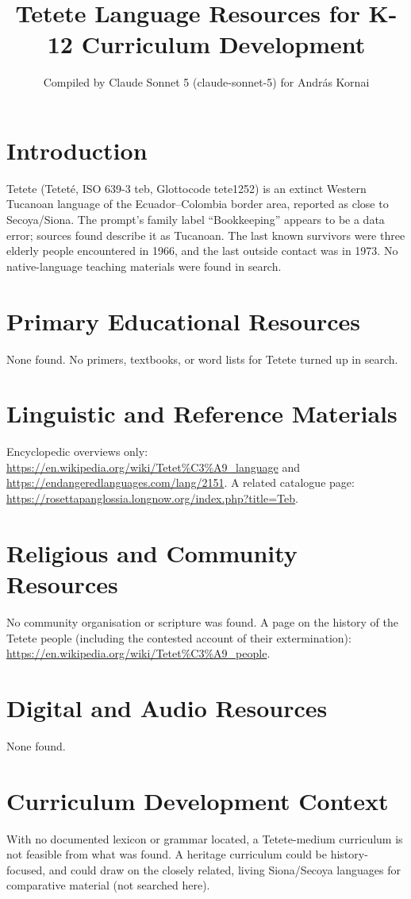 \documentclass[12pt]{article}
\title{Tetete Language Resources for K-12 Curriculum Development}
\author{Compiled by Claude Sonnet 5 (claude-sonnet-5) for Andr\'as Kornai}
\date{}
\begin{document}
\maketitle
\section{Introduction}
Tetete (Tetet\'e, ISO 639-3 teb, Glottocode tete1252) is an extinct Western Tucanoan language of the Ecuador--Colombia border area, reported as close to Secoya/Siona. The prompt's family label ``Bookkeeping'' appears to be a data error; sources found describe it as Tucanoan. The last known survivors were three elderly people encountered in 1966, and the last outside contact was in 1973. No native-language teaching materials were found in search.
\section{Primary Educational Resources}
None found. No primers, textbooks, or word lists for Tetete turned up in search.
\section{Linguistic and Reference Materials}
Encyclopedic overviews only: \url{https://en.wikipedia.org/wiki/Tetet%C3%A9_language} and \url{https://endangeredlanguages.com/lang/2151}. A related catalogue page: \url{https://rosettapanglossia.longnow.org/index.php?title=Teb}.
\section{Religious and Community Resources}
No community organisation or scripture was found. A page on the history of the Tetete people (including the contested account of their extermination): \url{https://en.wikipedia.org/wiki/Tetet%C3%A9_people}.
\section{Digital and Audio Resources}
None found.
\section{Curriculum Development Context}
With no documented lexicon or grammar located, a Tetete-medium curriculum is not feasible from what was found. A heritage curriculum could be history-focused, and could draw on the closely related, living Siona/Secoya languages for comparative material (not searched here).
\end{document}

